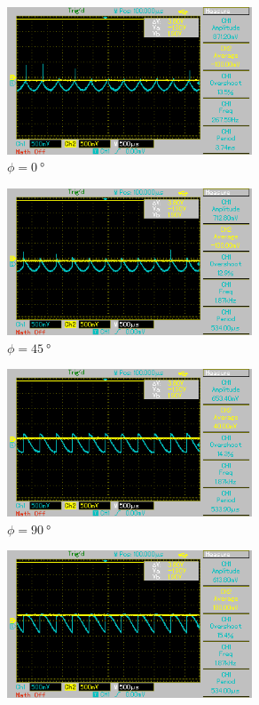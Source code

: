 \begin{figure}%
    \begin{subfigure}{0.5\textwidth}%
    \centering%
    \includegraphics[width = 7.3cm]{./Oszilloskop Bilder/png/5.2/T1.png}%
    \caption{$\phi = \qty[]{0}{\degree}$}%
    \end{subfigure}%
    \hfill%
    \begin{subfigure}{0.5\textwidth}%
    \centering%
    \includegraphics[width = 7.3cm]{./Oszilloskop Bilder/png/5.2/T2.png}%
    \caption{$\phi = \qty[]{45}{\degree}$}%
    \end{subfigure}%
    \hfill
    \begin{subfigure}{0.5\textwidth}%
    \centering%
    \includegraphics[width = 7.3cm]{./Oszilloskop Bilder/png/5.2/T3.png}%
    \caption{$\phi = \qty[]{90}{\degree}$}%
    \end{subfigure}%
    \hfill%
    \begin{subfigure}{0.5\textwidth}%
    \centering%
    \includegraphics[width = 7.3cm]{./Oszilloskop Bilder/png/5.2/T4.png}%

\end{subfigure}
\end{figure}
